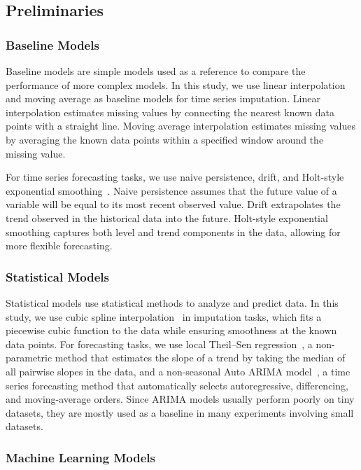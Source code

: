 \subsection{Preliminaries}

\subsubsection{Baseline Models}

Baseline models are simple models used as a reference to compare the performance of more complex models. In this study, we use linear interpolation and moving average as baseline models for time series imputation. Linear interpolation estimates missing values by connecting the nearest known data points with a straight line. Moving average interpolation estimates missing values by averaging the known data points within a specified window around the missing value.

For time series forecasting tasks, we use naive persistence, drift, and Holt-style exponential smoothing~\cite{holt2004forecasting}. Naive persistence assumes that the future value of a variable will be equal to its most recent observed value. Drift extrapolates the trend observed in the historical data into the future. Holt-style exponential smoothing captures both level and trend components in the data, allowing for more flexible forecasting.

\subsubsection{Statistical Models}

Statistical models use statistical methods to analyze and predict data. In this study, we use cubic spline interpolation~\cite{de1978practical} in imputation tasks, which fits a piecewise cubic function to the data while ensuring smoothness at the known data points. For forecasting tasks, we use local Theil--Sen regression~\cite{sen1968estimates}, a non-parametric method that estimates the slope of a trend by taking the median of all pairwise slopes in the data, and a non-seasonal Auto ARIMA model~\cite{box2015time}, a time series forecasting method that automatically selects autoregressive, differencing, and moving-average orders. Since ARIMA models usually perform poorly on tiny datasets, they are mostly used as a baseline in many experiments involving small datasets.

\subsubsection{Machine Learning Models}


